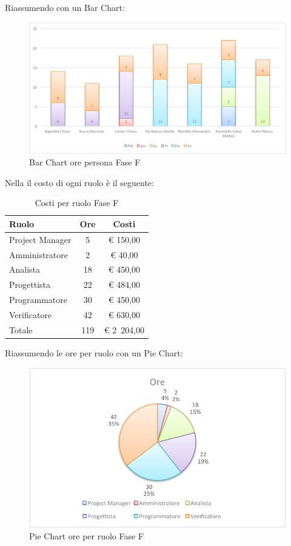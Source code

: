 				Riassumendo con un Bar Chart:
				\begin{figure}[H]\centering
					\includegraphics[width=\textwidth]{PianoDiProgetto/Pics/ChartOreFaseF.pdf}
					\caption{Bar Chart ore persona Fase F}
				\end{figure}
				Nella  il costo di ogni ruolo è il seguente:
				\begin{table}[H]
					\begin{center}
						\begin{tabular}{| l | c | c |}
							\hline
							Ruolo 				& Ore 		& Costi  \\ \hline
							
							Project Manager		& 5 		& \euro{} 150,00 	\\
							Amministratore 		& 2 		& \euro{} 40,00 	\\
							Analista	 		& 18 		& \euro{} 450,00 	\\
							Progettista 		& 22 		& \euro{} 484,00  	\\
							Programmatore		& 30 		& \euro{} 450,00 	\\
							Verificatore		& 42 		& \euro{} 630,00 	\\ \hline \hline
							
							Totale	 			& 119 		& \euro{} 2~204,00 	\\ \hline
						\end{tabular}
					\end{center}
					\caption{Costi per ruolo Fase F}
				\end{table}
				Riassumendo le ore per ruolo con un Pie Chart:
				\begin{figure}[H]\centering
					\includegraphics[width=\textwidth]{PianoDiProgetto/Pics/ChartTotOreFaseF.pdf}
					\caption{Pie Chart ore per ruolo Fase F}
				\end{figure}
